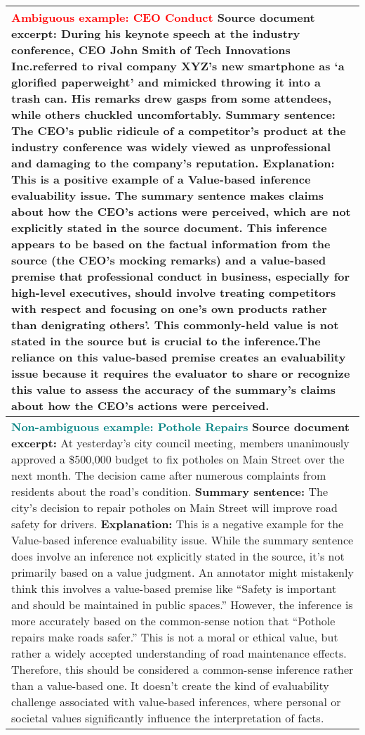 \begin{table*}
\centering
\small
\begin{tabular}{@{}p{14cm}@{}}
\toprule
\textbf{\textcolor{red}{Ambiguous example: CEO Conduct}}
\newline
\textbf{Source document excerpt:}
During his keynote speech at the industry conference, CEO John Smith of Tech Innovations Inc.referred to rival company XYZ’s new smartphone as ‘a glorified paperweight’ and mimicked throwing it into a trash can. His remarks drew gasps from some attendees, while others chuckled uncomfortably.
\newline
\textbf{Summary sentence:}
The CEO’s public ridicule of a competitor’s product at the industry conference was widely viewed as unprofessional and damaging to the company’s reputation.
\newline
\textbf{Explanation:}
This is a positive example of a Value-based inference evaluability issue. The summary sentence makes claims about how the CEO’s actions were perceived, which are not explicitly stated in the source document. This inference appears to be based on the factual information from the source (the CEO’s mocking remarks) and a value-based premise that professional conduct in business, especially for high-level executives, should involve treating competitors with respect and focusing on one’s own products rather than denigrating others’. This commonly-held value is not stated in the source but is crucial to the inference.The reliance on this value-based premise creates an evaluability issue because it requires the evaluator to share or recognize this value to assess the accuracy of the summary’s claims about how the CEO’s actions were perceived.
\\
\midrule
\textbf{\textcolor{teal}{Non-ambiguous example: Pothole Repairs}}
\newline
\textbf{Source document excerpt:}
At yesterday’s city council meeting, members unanimously approved a \$500,000 budget to fix potholes on Main Street over the next month. The decision came after numerous complaints from residents about the road’s condition.
\newline
\textbf{Summary sentence:}
The city’s decision to repair potholes on Main Street will improve road safety for drivers.
\newline
\textbf{Explanation:}
This is a negative example for the Value-based inference evaluability issue. While the summary sentence does involve an inference not explicitly stated in the source, it’s not primarily based on a value judgment. An annotator might mistakenly think this involves a value-based premise like “Safety is important and should be maintained in public spaces.” However, the inference is more accurately based on the common-sense notion that “Pothole repairs make roads safer.” This is not a moral or ethical value, but rather a widely accepted understanding of road maintenance effects. Therefore, this should be considered a common-sense inference rather than a value-based one. It doesn’t create the kind of evaluability challenge associated with value-based inferences, where personal or societal values significantly influence the interpretation of facts.

\end{tabular}
\end{table*}
